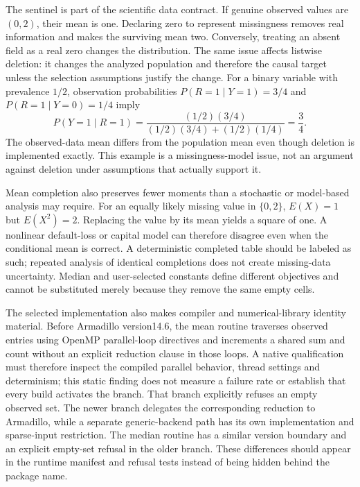 The sentinel is part of the scientific data contract. If genuine observed values are $(0,2)$, their mean is one. Declaring zero to represent missingness removes real information and makes the surviving mean two. Conversely, treating an absent field as a real zero changes the distribution. The same issue affects listwise deletion: it changes the analyzed population and therefore the causal target unless the selection assumptions justify the change. For a binary variable with prevalence $1/2$, observation probabilities $P(R=1\mid Y=1)=3/4$ and $P(R=1\mid Y=0)=1/4$ imply
\[
 P(Y=1\mid R=1)=
 \frac{(1/2)(3/4)}{(1/2)(3/4)+(1/2)(1/4)}=\frac34.
\]
The observed-data mean differs from the population mean even though deletion is implemented exactly. This example is a missingness-model issue, not an argument against deletion under assumptions that actually support it.~\citep{exec25_ctm_mlpack,exec25_ctm_choice}

Mean completion also preserves fewer moments than a stochastic or model-based analysis may require. For an equally likely missing value in $\{0,2\}$, $E(X)=1$ but $E(X^2)=2$. Replacing the value by its mean yields a square of one. A nonlinear default-loss or capital model can therefore disagree even when the conditional mean is correct. A deterministic completed table should be labeled as such; repeated analysis of identical completions does not create missing-data uncertainty. Median and user-selected constants define different objectives and cannot be substituted merely because they remove the same empty cells.~\citep{exec25_ctm_choice}

The selected implementation also makes compiler and numerical-library identity material. Before Armadillo version14.6, the mean routine traverses observed entries using OpenMP parallel-loop directives and increments a shared sum and count without an explicit reduction clause in those loops. A native qualification must therefore inspect the compiled parallel behavior, thread settings and determinism; this static finding does not measure a failure rate or establish that every build activates the branch. That branch explicitly refuses an empty observed set. The newer branch delegates the corresponding reduction to Armadillo, while a separate generic-backend path has its own implementation and sparse-input restriction. The median routine has a similar version boundary and an explicit empty-set refusal in the older branch. These differences should appear in the runtime manifest and refusal tests instead of being hidden behind the package name.~\citep{exec25_ctm_mlpack}

